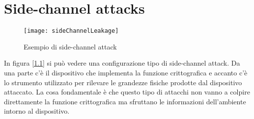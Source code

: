 \chapter{Side-channel attacks}

	\begin{figure}
		\begin{center}
			\texttt{[image: sideChannelLeakage]}
			\caption{Esempio di side-channel attack}
			\label{fig:attack}
		\end{center}
	\end{figure}
	
	In figura [\ref{fig:attack}] si può vedere una configurazione tipo di side-channel attack. Da una parte c'è il dispositivo che implementa la funzione crittografica e accanto c'è lo strumento utilizzato per rilevare le grandezze fisiche prodotte dal dispositivo attaccato. La cosa fondamentale è che questo tipo di attacchi non vanno a colpire direttamente la funzione crittografica ma sfruttano le informazioni dell'ambiente intorno al dispositivo.